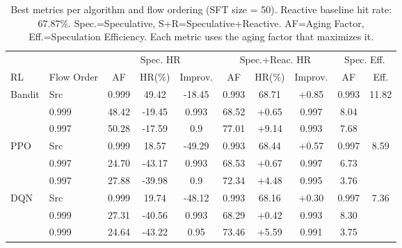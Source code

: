 \begin{table}[t]
\centering
\caption{Best metrics per algorithm and flow ordering (SFT size = 50). Reactive baseline hit rate: 67.87\%. Spec.=Speculative, S+R=Speculative+Reactive. AF=Aging Factor, Eff.=Speculation Efficiency. Each metric uses the aging factor that maximizes it.}
\label{tab:unified-metrics-tablesize50}
\small
\begin{tabular}{@{}llcccccccc@{}}
\toprule
& & \multicolumn{3}{c}{Spec. HR} & \multicolumn{3}{c}{Spec.+Reac. HR} & \multicolumn{2}{c}{Spec. Eff.} \\
\cmidrule(lr){3-5} \cmidrule(lr){6-8} \cmidrule(lr){9-10}
RL & Flow Order & AF & HR(\%) & Improv. & AF & HR(\%) & Improv. & AF & Eff. \\
\midrule
\multirow{3}{*}{Bandit} & Src & 0.999 & 49.42 & -18.45 & 0.993 & 68.71 & +0.85 & 0.993 & 11.82 \\
Dest & 0.999 & 48.42 & -19.45 & 0.993 & 68.52 & +0.65 & 0.997 & 8.04 \\
Trace & 0.997 & 50.28 & -17.59 & 0.9 & 77.01 & +9.14 & 0.993 & 7.68 \\
\multirow{3}{*}{PPO} & Src & 0.999 & 18.57 & -49.29 & 0.993 & 68.44 & +0.57 & 0.997 & 8.59 \\
Dest & 0.997 & 24.70 & -43.17 & 0.993 & 68.53 & +0.67 & 0.997 & 6.73 \\
Trace & 0.997 & 27.88 & -39.98 & 0.9 & 72.34 & +4.48 & 0.995 & 3.76 \\
\multirow{3}{*}{DQN} & Src & 0.999 & 19.74 & -48.12 & 0.993 & 68.16 & +0.30 & 0.997 & 7.36 \\
Dest & 0.999 & 27.31 & -40.56 & 0.993 & 68.29 & +0.42 & 0.993 & 8.30 \\
Trace & 0.999 & 24.64 & -43.22 & 0.95 & 73.46 & +5.59 & 0.991 & 3.75 \\
\bottomrule
\end{tabular}
\end{table}
